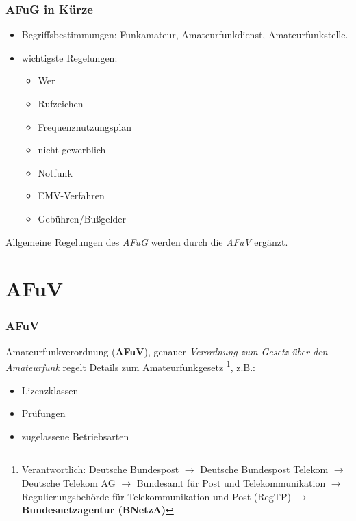 \begin{frame}
    \frametitle{AFuG in Kürze}

    \begin{itemize}
        \item Begriffsbestimmungen: Funkamateur, Amateurfunkdienst,
              Amateurfunkstelle.
        \item wichtigste Regelungen:
            \begin{itemize}
                \item Wer
                \item Rufzeichen
                \item Frequenznutzungsplan
                \item nicht-gewerblich
                \item Notfunk
                \item EMV-Verfahren
                \item Gebühren/Bußgelder
            \end{itemize}
    \end{itemize}

    Allgemeine Regelungen des \emph{AFuG} werden durch die \emph{AFuV} ergänzt.

\end{frame}

\section{AFuV}

\begin{frame}
    \frametitle{AFuV}

    Amateurfunkverordnung (\textbf{AFuV}), genauer \emph{Verordnung zum Gesetz
    über den Amateurfunk} regelt Details zum Amateurfunkgesetz
    \footnote{Verantwortlich: Deutsche Bundespost $\rightarrow$ Deutsche
    Bundespost Telekom $\rightarrow$ Deutsche Telekom AG $\rightarrow$
    Bundesamt für Post und Telekommunikation $\rightarrow$ Regulierungsbehörde
    für Telekommunikation und Post (RegTP) $\rightarrow$
    \textbf{Bundesnetzagentur (BNetzA)}}, z.B.:

    \begin{itemize}
        \item Lizenzklassen
        \item Prüfungen
        \item zugelassene Betriebsarten
    \end{itemize}

\end{frame}

